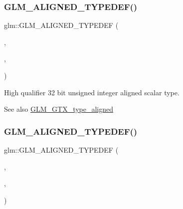 \subsubsection{\texorpdfstring{G\+L\+M\+\_\+\+A\+L\+I\+G\+N\+E\+D\+\_\+\+T\+Y\+P\+E\+D\+E\+F()}{GLM\_ALIGNED\_TYPEDEF()}\hspace{0.1cm}{\footnotesize\ttfamily [103/209]}}
{\footnotesize\ttfamily glm\+::\+G\+L\+M\+\_\+\+A\+L\+I\+G\+N\+E\+D\+\_\+\+T\+Y\+P\+E\+D\+EF (\begin{DoxyParamCaption}\item[{\hyperlink{group__gtc__type__precision_gae8e8a2c712653891a03c171795286ac5}{highp\+\_\+u32}}]{,  }\item[{aligned\+\_\+highp\+\_\+u32}]{,  }\item[{4}]{ }\end{DoxyParamCaption})}

High qualifier 32 bit unsigned integer aligned scalar type. \begin{DoxySeeAlso}{See also}
\hyperlink{group__gtx__type__aligned}{G\+L\+M\+\_\+\+G\+T\+X\+\_\+type\+\_\+aligned} 
\end{DoxySeeAlso}
\mbox{\label{group__gtx__type__aligned_ga92024d27c74a3650afb55ec8e024ed25}} 
\subsubsection{\texorpdfstring{G\+L\+M\+\_\+\+A\+L\+I\+G\+N\+E\+D\+\_\+\+T\+Y\+P\+E\+D\+E\+F()}{GLM\_ALIGNED\_TYPEDEF()}\hspace{0.1cm}{\footnotesize\ttfamily [104/209]}}
{\footnotesize\ttfamily glm\+::\+G\+L\+M\+\_\+\+A\+L\+I\+G\+N\+E\+D\+\_\+\+T\+Y\+P\+E\+D\+EF (\begin{DoxyParamCaption}\item[{\hyperlink{group__gtc__type__precision_ga6006ea883d3c0491791650b2fb84de39}{highp\+\_\+u64}}]{,  }\item[{aligned\+\_\+highp\+\_\+u64}]{,  }\item[{8}]{ }\end{DoxyParamCaption})}

